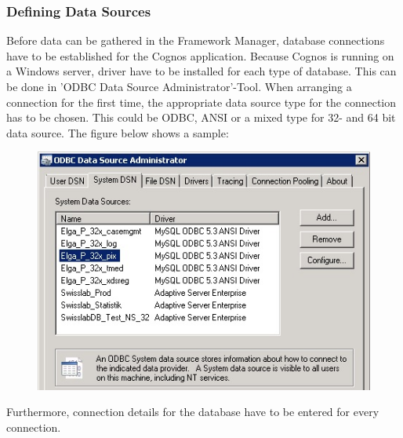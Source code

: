 \documentclass[a4paper]{article}
\begin{document}
	\subsubsection{Defining Data Sources}
	Before data can be gathered in the Framework Manager, database connections have
	to be established for the Cognos application. Because Cognos is running on a
	Windows server, driver have to be installed for each type of database. This
	can be done in 'ODBC Data Source Administrator'-Tool. When arranging a
	connection for the first time, the appropriate data source type for the
	connection has to be chosen. This could be ODBC, ANSI or a mixed type for 32-
	and 64 bit data source. The figure below shows a sample:\\
	\begin{figure}[!ht]
		  \centering
		      \includegraphics[width=1.0\textwidth]{ExistingDataSource}
		  \caption{}
	\end{figure}
	Furthermore, connection details for the database have to be entered for every
	connection.
\end{document}
